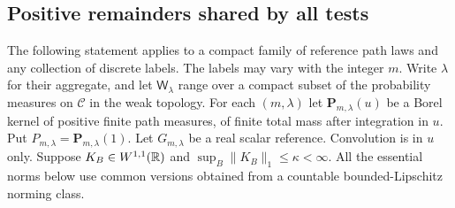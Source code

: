 \subsection{Positive remainders shared by all tests}
The following statement applies to a compact family of reference path
laws and any collection of discrete labels. The labels may vary with
the integer $m$. Write $\lambda$ for their aggregate, and let
$\mathsf W_\lambda$ range over a compact subset of the probability
measures on $\mathcal C$ in the weak topology.
For each $(m,\lambda)$ let $\mathbf P_{m,\lambda}(u)$ be a Borel
kernel of positive finite path measures, of finite total mass after
integration in $u$. Put $P_{m,\lambda}=\mathbf P_{m,\lambda}(1)$.
Let $G_{m,\lambda}$ be a real scalar reference. Convolution is in
$u$ only. Suppose $K_B\in W^{1,1}(\mathbb R)$ and
$\sup_B\|K_B\|_1\le\kappa<\infty$.
All the essential norms below use common versions obtained from a
countable bounded-Lipschitz norming class.

